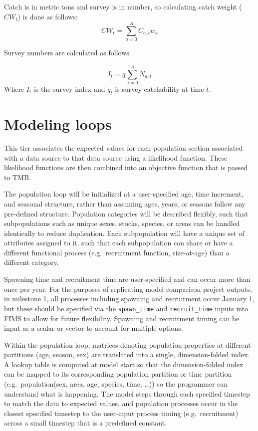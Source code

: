 \documentclass[
]{book}
\begin{document}
Catch is in metric tons and survey is in number, so calculating catch weight (\(CW_t\)) is done as follows:
\[ CW_t=\sum_{a=0}^A C_{a,t}w_a \]

Survey numbers are calculated as follows

\[I_t=q\sum_{a=0}^AN_{a,t}\]
Where \(I_t\) is the survey index and \(q_t\) is survey catchability at time \(t\).

\hypertarget{modeling-loops}{%
\section{Modeling loops}\label{modeling-loops}}

This tier associates the expected values for each population section associated with a data source to that data source using a likelihood function. These likelihood functions are then combined into an objective function that is passed to TMB.

The population loop will be initialized at a user-specified age, time increment, and seasonal structure, rather than assuming ages, years, or seasons follow any pre-defined structure. Population categories will be described flexibly, such that subpopulations such as unique sexes, stocks, species, or areas can be handled identically to reduce duplication. Each subpopulation will have a unique set of attributes assigned to it, such that each subpopulation can share or have a different functional process (e.g.~recruitment function, size-at-age) than a different category.

Spawning time and recruitment time are user-specified and can occur more than once per year. For the purposes of replicating model comparison project outputs, in milestone 1, all processes including spawning and recruitment occur January 1, but these should be specified via the \texttt{spawn\_time} and \texttt{recruit\_time} inputs into FIMS to allow for future flexibility. Spawning and recruitment timing can be input as a scalar or vector to account for multiple options.

Within the population loop, matrices denoting population properties at different partitions (age, season, sex) are translated into a single, dimension-folded index. A lookup table is computed at model start so that the dimension-folded index can be mapped to its corresponding population partition or time partition (e.g.~population(sex, area, age, species, time, \ldots)) so the programmer can understand what is happening. The model steps through each specified timestep to match the data to expected values, and population processes occur in the closest specified timestep to the user-input process timing (e.g.~recruitment) across a small timestep that is a predefined constant.
\end{document}
